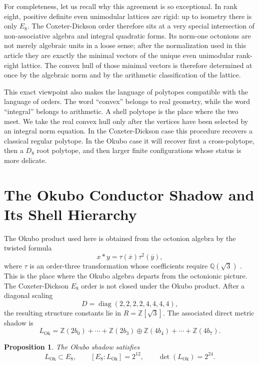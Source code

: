 \documentclass{birkjour}
\newtheorem{proposition}[theorem]{Proposition}
\newcommand{\LOk}{L_{\mathrm{Ok}}}
\newcommand{\ZZ}{\mathbb Z}
\newcommand{\QQ}{\mathbb Q}
\numberwithin{equation}{section}
\begin{document}
For completeness, let us recall why this agreement is so exceptional. In rank
eight, positive definite even unimodular lattices are rigid: up to isometry
there is only \(E_8\). The Coxeter-Dickson order therefore sits at a very
special intersection of non-associative algebra and integral quadratic forms.
Its norm-one octonions are not merely algebraic units in a loose sense; after
the normalization used in this article they are exactly the minimal vectors of
the unique even unimodular rank-eight lattice. The convex hull of those
minimal vectors is therefore determined at once by the algebraic norm and by
the arithmetic classification of the lattice.

This exact viewpoint also makes the language of polytopes compatible with the
language of orders. The word ``convex'' belongs to real geometry, while the
word ``integral'' belongs to arithmetic. A shell polytope is the place where
the two meet. We take the real convex hull only after the vertices have been
selected by an integral norm equation. In the Coxeter-Dickson case this
procedure recovers a classical regular polytope. In the Okubo case it will
recover first a cross-polytope, then a \(D_8\) root polytope, and then larger
finite configurations whose status is more delicate.

\section{The Okubo Conductor Shadow and Its Shell Hierarchy}

The Okubo product used here is obtained from the octonion algebra by the
twisted formula
\begin{equation}
x*y=\tau(\overline x)\tau^2(\overline y),
\end{equation}
where \(\tau\) is an order-three transformation whose coefficients require
\(\QQ(\sqrt3)\) \cite{ElduqueComposition}. This is the place where the Okubo algebra departs from the
octonionic picture. The Coxeter-Dickson \(E_8\) order is not closed under the
Okubo product. After a diagonal scaling
\begin{equation}
D=\operatorname{diag}(2,2,2,2,4,4,4,4),
\end{equation}
the resulting structure constants lie in \(R=\ZZ[\sqrt3]\). The associated
direct metric shadow is
\begin{equation}
\LOk=\ZZ(2b_0)+\cdots+\ZZ(2b_3)
\oplus\ZZ(4b_4)+\cdots+\ZZ(4b_7).
\end{equation}

\begin{proposition}
The Okubo shadow satisfies
\begin{equation}
\LOk\subset E_8,\qquad [E_8:\LOk]=2^{12},\qquad \det(\LOk)=2^{24}.
\end{equation}
\end{proposition}
\end{document}
